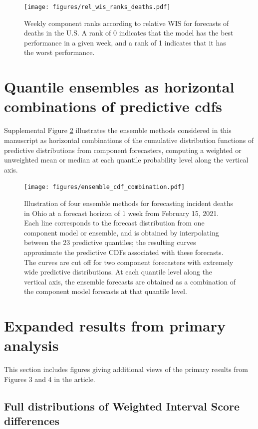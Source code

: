 \documentclass{article}
\begin{document}
\begin{figure}[H]
    \centering
    \texttt{[image: figures/rel\_wis\_ranks\_deaths.pdf]}
    \caption{Weekly component ranks according to relative WIS for forecasts of deaths in the U.S. A rank of 0 indicates that the model has the best performance in a given week, and a rank of 1 indicates that it has the worst performance.}
    \label{fig:rel_wis_ranks_deaths}
\end{figure}

\section{Quantile ensembles as horizontal combinations of predictive cdfs}

Supplemental Figure \ref{fig:ensemble_cdf_combination} illustrates the ensemble methods considered in this manuscript as horizontal combinations of the cumulative distribution functions of predictive distributions from component forecasters, computing a weighted or unweighted mean or median at each quantile probability level along the vertical axis.

\begin{figure}[H]
    \centering
    \texttt{[image: figures/ensemble\_cdf\_combination.pdf]}
    \caption{Illustration of four ensemble methods for forecasting incident deaths in Ohio at a forecast horizon of 1 week from February 15, 2021. Each line corresponds to the forecast distribution from one component model or ensemble, and is obtained by interpolating between the 23 predictive quantiles; the resulting curves approximate the predictive CDFs associated with these forecasts. The curves are cut off for two component forecasters with extremely wide predictive distributions. At each quantile level along the vertical axis, the ensemble forecasts are obtained as a combination of the component model forecasts at that quantile level.}
    \label{fig:ensemble_cdf_combination}
\end{figure}

\newpage

\section{Expanded results from primary analysis}

This section includes figures giving additional views of the primary results from Figures 3 and 4 in the article.

\subsection{Full distributions of Weighted Interval Score differences}
\end{document}
